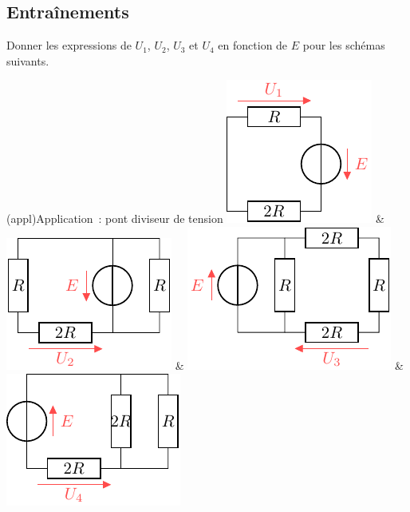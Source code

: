 \documentclass[../../main/main.tex]{subfiles}
\begin{document}
\subsection{Entraînements}
Donner les expressions de $U_1$, $U_2$, $U_3$ et $U_4$ en fonction de $E$
pour les schémas suivants.
\begin{tcb}[tabularx={Y|Y|Y|Y}](appl){Application~: pont diviseur de tension}
	\includegraphics[scale=1]{pdt_a-plain}
	\vspace{12pt}
	&
	\includegraphics[scale=1]{pdt_b-plain}
	&
	\includegraphics[scale=1]{pdt_c-plain}
	&
	\includegraphics[scale=1]{pdt_d-plain}
	\\
	\begin{center}

\end{center}
\end{tcb}
\end{document}
